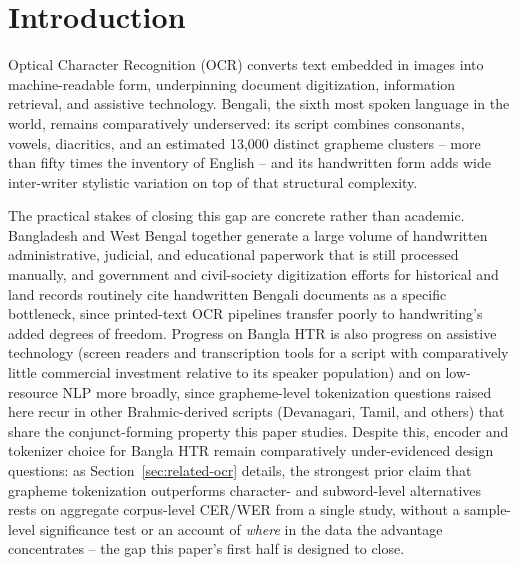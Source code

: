\documentclass[a4paper,fleqn]{cas-dc}
\begin{document}
\maketitle

\section{Introduction}
\label{sec:introduction}

Optical Character Recognition (OCR) converts text embedded in images into
machine-readable form, underpinning document digitization, information
retrieval, and assistive technology. Bengali, the sixth most spoken
language in the world, remains comparatively underserved: its script
combines consonants, vowels, diacritics, and an estimated 13{,}000 distinct
grapheme clusters \citep{alam2021graphemes} -- more than fifty times the
inventory of English -- and its handwritten form adds wide inter-writer
stylistic variation on top of that structural complexity.

The practical stakes of closing this gap are concrete rather than
academic. Bangladesh and West Bengal together generate a large volume of
handwritten administrative, judicial, and educational paperwork that is
still processed manually, and government and civil-society digitization
efforts for historical and land records routinely cite handwritten
Bengali documents as a specific bottleneck, since printed-text OCR
pipelines transfer poorly to handwriting's added degrees of freedom.
Progress on Bangla HTR is also progress on assistive technology (screen
readers and transcription tools for a script with comparatively little
commercial investment relative to its speaker population) and on
low-resource NLP more broadly, since grapheme-level tokenization
questions raised here recur in other Brahmic-derived scripts (Devanagari,
Tamil, and others) that share the conjunct-forming property this paper
studies. Despite this, encoder and tokenizer choice for Bangla HTR remain
comparatively under-evidenced design questions: as
Section~\ref{sec:related-ocr} details, the strongest prior claim that
grapheme tokenization outperforms character- and subword-level
alternatives rests on aggregate corpus-level CER/WER from a single study,
without a sample-level significance test or an account of \emph{where} in
the data the advantage concentrates -- the gap this paper's first half is
designed to close.
\end{document}
